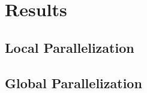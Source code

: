 \chapter{Results} \label{chap:results}
\section{Local Parallelization}
\section{Global Parallelization}


